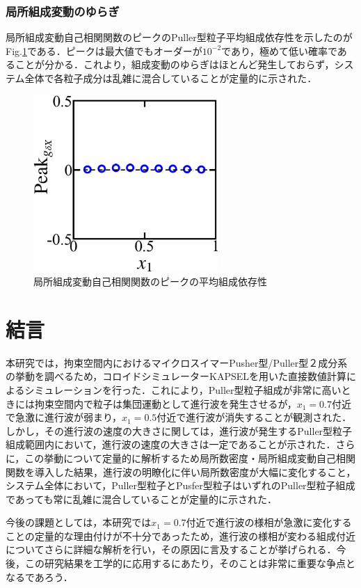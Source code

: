 \documentclass[11pt,a4j]{jarticle}
\begin{document}
\subsubsection{局所組成変動のゆらぎ}
\par 局所組成変動自己相関関数のピークのPuller型粒子平均組成依存性を示したのがFig.\ref{X_yuragi}である．ピークは最大値でもオーダーが$10^{-2}$であり，極めて低い確率であることが分かる．これより，組成変動のゆらぎはほとんど発生しておらず，システム全体で各粒子成分は乱雑に混合していることが定量的に示された．

\vspace*{20truemm}
\begin{figure}[h]
\begin{center}
\includegraphics[width=70mm]{./images/Peak_X.png}
\caption{局所組成変動自己相関関数のピークの平均組成依存性}
\label{X_yuragi}
\vspace{0truemm}
\end{center}
\end{figure}

\newpage
\section{結言}
\par 本研究では，拘束空間内におけるマイクロスイマーPusher型/Puller型２成分系の挙動を調べるため，コロイドシミュレーターKAPSELを用いた直接数値計算によるシミュレーションを行った．これにより，Puller型粒子組成が非常に高いときには拘束空間内で粒子は集団運動として進行波を発生させるが，$x_1=0.7$付近で急激に進行波が弱まり，$x_1=0.5$付近で進行波が消失することが観測された．しかし，その進行波の速度の大きさに関しては，進行波が発生するPuller型粒子組成範囲内において，進行波の速度の大きさは一定であることが示された．さらに，この挙動について定量的に解析するため局所数密度・局所組成変動自己相関関数を導入した結果，進行波の明瞭化に伴い局所数密度が大幅に変化すること，システム全体において，Puller型粒子とPusfer型粒子はいずれのPuller型粒子組成であっても常に乱雑に混合していることが定量的に示された．
\par 今後の課題としては，本研究では$x_1=0.7$付近で進行波の様相が急激に変化することの定量的な理由付けが不十分であったため，進行波の様相が変わる組成付近についてさらに詳細な解析を行い，その原因に言及することが挙げられる．今後，この研究結果を工学的に応用するにあたり，そのことは非常に重要な争点となるであろう．
\end{document}
